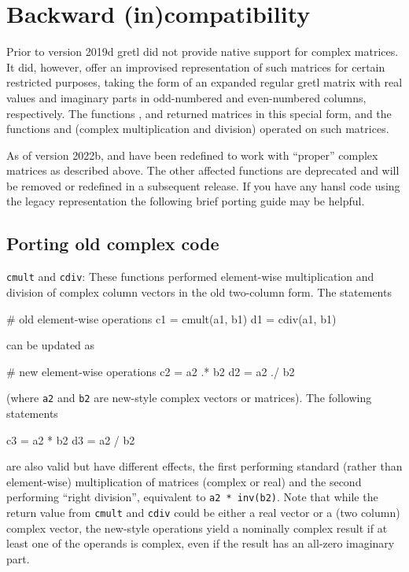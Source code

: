 \section{Backward (in)compatibility}
\label{sec:cmplx-compat}

Prior to version 2019d gretl did not provide native support for
complex matrices. It did, however, offer an improvised representation
of such matrices for certain restricted purposes, taking the form of
an expanded regular gretl matrix with real values and imaginary parts
in odd-numbered and even-numbered columns, respectively.  The
functions ,  and  returned
matrices in this special form, and the functions  and
 (complex multiplication and division) operated on such
matrices.

As of version 2022b,  and  have been redefined
to work with ``proper'' complex matrices as described above. The other
affected functions are deprecated and will be removed or redefined in
a subsequent release. If you have any hansl code using the legacy
representation the following brief porting guide may be helpful.

\subsection{Porting old complex code}

\texttt{cmult} and \texttt{cdiv}: These functions performed
element-wise multiplication and division of complex column vectors in
the old two-column form. The statements
\begin{code}
# old element-wise operations
c1 = cmult(a1, b1)
d1 = cdiv(a1, b1)
\end{code}
can be updated as
\begin{code}
# new element-wise operations
c2 = a2 .* b2
d2 = a2 ./ b2
\end{code}
(where \texttt{a2} and \texttt{b2} are new-style complex vectors or
matrices). The following statements
\begin{code}
c3 = a2 * b2
d3 = a2 / b2
\end{code}
are also valid but have different effects, the first performing
standard (rather than element-wise) multiplication of matrices
(complex or real) and the second performing ``right division'',
equivalent to \texttt{a2 * inv(b2)}. Note that while the return value
from \texttt{cmult} and \texttt{cdiv} could be either a real vector or
a (two column) complex vector, the new-style operations yield a
nominally complex result if at least one of the operands is complex,
even if the result has an all-zero imaginary part.

